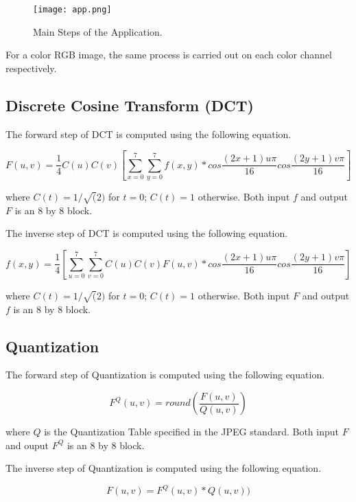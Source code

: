\begin{figure}
\centering
\texttt{[image: app.png]}
\caption{Main Steps of the Application.}
\label{fig:app}
\end{figure}

For a color RGB image, the same process is carried out on each color channel respectively.

\subsection{Discrete Cosine Transform (DCT)}

The forward step of DCT is computed using the following equation.

\begin{equation}
F(u, v) = \frac{1}{4} C(u) C(v) [\sum_{x=0}^7 \sum_{y=0}^7 f(x,y) * cos\frac{(2x+1)u\pi}{16} cos\frac{(2y+1)v\pi}{16}]
\label{equ:fdct}
\end{equation}

where $C(t) = 1/\sqrt(2)$ for $t = 0$; $C(t) = 1$ otherwise. Both input $f$ and output $F$ is an 8 by 8 block.

The inverse step of DCT is computed using the following equation.

\begin{equation}
f(x, y) = \frac{1}{4} [\sum_{u=0}^7 \sum_{v=0}^7 C(u) C(v) F(u, v) * cos\frac{(2x+1)u\pi}{16} cos\frac{(2y+1)v\pi}{16}]
\label{equ:idct}
\end{equation}

where $C(t) = 1/\sqrt(2)$ for $t = 0$; $C(t) = 1$ otherwise. Both input $F$ and output $f$ is an 8 by 8 block.

\subsection{Quantization}

The forward step of Quantization is computed using the following equation.

\begin{equation}
F^Q(u, v) = round(\frac{F(u, v)}{Q(u, v)})
\label{equ:fq}
\end{equation}

where $Q$ is the Quantization Table specified in the JPEG standard. Both input $F$ and ouput $F^Q$ is an 8 by 8 block.

The inverse step of Quantization is computed using the following equation.

\begin{equation}
F(u, v) = F^Q(u, v) * Q(u, v))
\label{equ:iq}
\end{equation}

